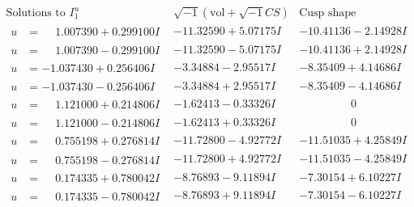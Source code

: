 \documentclass[1p]{elsarticle_modified}
\theoremstyle{definition}
\newcommand{\I}{\sqrt{-1}}
\begin{document}
$$\begin{array}{c|c|c}  
\text{Solutions to }I^u_{1}& \I (\text{vol} + \sqrt{-1}CS) & \text{Cusp shape}\\
 \hline 
\begin{aligned}
u &= \phantom{-}1.007390 + 0.299100 I\end{aligned}
 & -11.32590 + 5.07175 I & -10.41136 - 2.14928 I \\ \hline\begin{aligned}
u &= \phantom{-}1.007390 - 0.299100 I\end{aligned}
 & -11.32590 - 5.07175 I & -10.41136 + 2.14928 I \\ \hline\begin{aligned}
u &= -1.037430 + 0.256406 I\end{aligned}
 & -3.34884 - 2.95517 I & -8.35409 + 4.14686 I \\ \hline\begin{aligned}
u &= -1.037430 - 0.256406 I\end{aligned}
 & -3.34884 + 2.95517 I & -8.35409 - 4.14686 I \\ \hline\begin{aligned}
u &= \phantom{-}1.121000 + 0.214806 I\end{aligned}
 & -1.62413 - 0.33326 I & \phantom{-0.000000 } 0 \\ \hline\begin{aligned}
u &= \phantom{-}1.121000 - 0.214806 I\end{aligned}
 & -1.62413 + 0.33326 I & \phantom{-0.000000 } 0 \\ \hline\begin{aligned}
u &= \phantom{-}0.755198 + 0.276814 I\end{aligned}
 & -11.72800 - 4.92772 I & -11.51035 + 4.25849 I \\ \hline\begin{aligned}
u &= \phantom{-}0.755198 - 0.276814 I\end{aligned}
 & -11.72800 + 4.92772 I & -11.51035 - 4.25849 I \\ \hline\begin{aligned}
u &= \phantom{-}0.174335 + 0.780042 I\end{aligned}
 & -8.76893 - 9.11894 I & -7.30154 + 6.10227 I \\ \hline\begin{aligned}
u &= \phantom{-}0.174335 - 0.780042 I\end{aligned}
 & -8.76893 + 9.11894 I & -7.30154 - 6.10227 I \\ \hline\begin{aligned}

\end{aligned}
\end{array}$$
\end{document}
